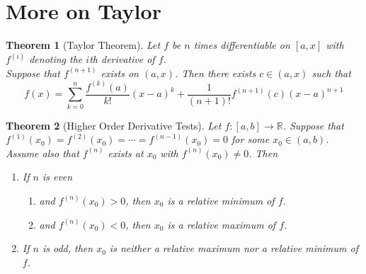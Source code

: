 \documentclass[12pt]{article}
\newtheorem{theorem}{Theorem}[section]
\theoremstyle{definition}
\begin{document}
\section{More on Taylor}
\begin{theorem}[Taylor Theorem]
\normalfont Let $f$ be $n$ times differentiable on $[a,x]$ with $f^{(i)}$ denoting the $i$th derivative of $f$.\\Suppose that $f^{(n+1)}$ exists on $(a,x)$. Then there exists $c\in(a,x)$ such that
\[
f(x)=\sum_{k=0}^n \frac{f^{(k)}(a)}{k!}(x-a)^k + \frac{1}{(n+1)!}f^{(n+1)}(c)(x-a)^{n+1}
\]
\end{theorem}
\begin{theorem}[Higher Order Derivative Tests]
\normalfont Let $f:[a,b]\to \mathbb{R}$. Suppose that $f^{(1)}(x_0)=f^{(2)}(x_0)=\cdots=f^{(n-1)}(x_0)=0$ for some $x_0\in(a,b)$.\\
Assume also that $f^{(n)}$ exists at $x_0$ with $f^{(n)}(x_0)\neq 0$. Then
\begin{enumerate}
	\item If $n$ is even
	\begin{enumerate}
		\item and $f^{(n)}(x_0)>0$, then $x_0$ is a relative minimum of $f$.
		\item and $f^{(n)}(x_0)<0$, then $x_0$ is a relative maximum of $f$.
	\end{enumerate}
	\item If $n$ is odd, then $x_0$ is neither a relative maximum nor a relative minimum of $f$.
\end{enumerate}
\end{theorem}
\end{document}
